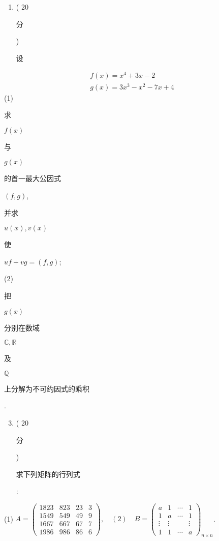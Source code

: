 \documentclass[10pt]{article}
\begin{document}
\begin{enumerate}
  \item ( 20 \begin{CJK}{UTF8}{mj}分\end{CJK}) \begin{CJK}{UTF8}{mj}设\end{CJK}
\end{enumerate}
$$
\begin{gathered}
f(x)=x^{4}+3 x-2 \\
g(x)=3 x^{3}-x^{2}-7 x+4
\end{gathered}
$$
(1) \begin{CJK}{UTF8}{mj}求\end{CJK} $f(x)$ \begin{CJK}{UTF8}{mj}与\end{CJK} $g(x)$ \begin{CJK}{UTF8}{mj}的首一最大公因式\end{CJK} $(f, g)$, \begin{CJK}{UTF8}{mj}并求\end{CJK} $u(x), v(x)$ \begin{CJK}{UTF8}{mj}使\end{CJK} $u f+v g=(f, g)$;

(2) \begin{CJK}{UTF8}{mj}把\end{CJK} $g(x)$ \begin{CJK}{UTF8}{mj}分别在数域\end{CJK} $\mathbb{C}, \mathbb{R}$ \begin{CJK}{UTF8}{mj}及\end{CJK} $\mathbb{Q}$ \begin{CJK}{UTF8}{mj}上分解为不可约因式的乘积\end{CJK}.

\begin{enumerate}
  \setcounter{enumi}{2}
  \item ( 20 \begin{CJK}{UTF8}{mj}分\end{CJK}) \begin{CJK}{UTF8}{mj}求下列矩阵的行列式\end{CJK}:
\end{enumerate}
(1) $A=\left(\begin{array}{cccc}1823 & 823 & 23 & 3 \\ 1549 & 549 & 49 & 9 \\ 1667 & 667 & 67 & 7 \\ 1986 & 986 & 86 & 6\end{array}\right), \quad(2) \quad B=\left(\begin{array}{cccc}a & 1 & \cdots & 1 \\ 1 & a & \cdots & 1 \\ \vdots & \vdots & & \vdots \\ 1 & 1 & \cdots & a\end{array}\right)_{n \times n}$.
\end{document}
